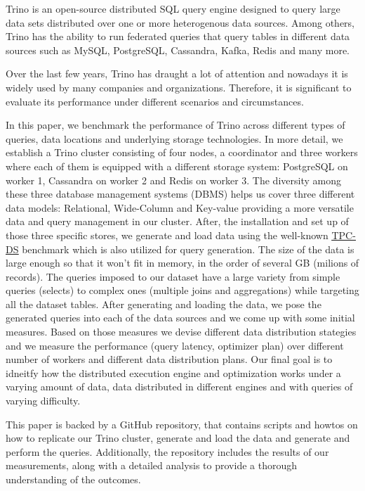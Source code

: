 \documentclass[conference]{IEEEtran}
\begin{document}
Trino is an open-source distributed SQL query engine designed to query large data sets distributed over
one or more heterogenous data sources. Among others, Trino has the ability to run federated queries that
query tables in different data sources such as MySQL, PostgreSQL, Cassandra, Kafka, Redis and many more.

Over the last few years, Trino has draught a lot of attention and nowadays it is widely used by many 
companies and organizations. Therefore, it is significant to evaluate its performance under different 
scenarios and circumstances.

In this paper, we benchmark the performance of Trino across different types of queries, data locations and underlying
storage technologies. In more detail, we establish a Trino cluster consisting of four nodes, a coordinator and three workers 
where each of them is equipped with a different storage system: PostgreSQL on worker 1, Cassandra on worker 2 and Redis on worker 3. 
The diversity among these three database management systems (DBMS) helps us cover three different data models: 
Relational, Wide-Column and Key-value providing a more versatile data and query management in our cluster. After, the installation and set up of those three specific stores, we generate and load
data using the well-known \textcolor{linkblue}{\underline{\href{https://www.tpc.org/tpcds/}{TPC-DS}}} benchmark which is also utilized for query generation.
The size of the data is large enough so that it won't fit in memory, in the order of several GB (milions of records). 
The queries imposed to our dataset have a large variety from simple queries (selects) to complex ones (multiple joins and aggregations) while targeting all the dataset tables.
After generating and loading the data, we pose the generated queries into each of the data sources and we come up with some
initial measures. Based on those measures we devise different data distribution stategies and we measure the performance
(query latency, optimizer plan) over different number of workers and different data distribution plans. Our final goal is to
idneitfy how the distributed execution engine and optimization works under a varying amount of data, data distributed in
different engines and with queries of varying difficulty. 

This paper is backed by a GitHub repository, that contains scripts and howtos on how to replicate our Trino cluster, generate and load the data and 
generate and perform the queries. Additionally, the repository includes the results of our measurements, along with a detailed analysis to provide a 
thorough understanding of the outcomes.
\end{document}

